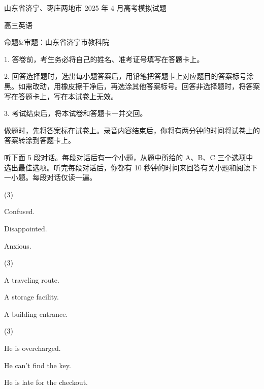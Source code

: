 \documentclass{英语试卷}
\begin{document}
\par 山东省济宁、枣庄两地市 2025 年 4 月高考模拟试题\par
\par 高三英语\par
\par 命题\&审题：山东省济宁市教科院\par
\begin{notice}
\par 1. 答卷前，考生务必将自己的姓名、准考证号填写在答题卡上。\par
\par 2. 回答选择题时，选出每小题答案后，用铅笔把答题卡上对应题目的答案标号涂黑。如需改动，用橡皮擦干净后，再选涂其他答案标号。回答非选择题时，将答案写在答题卡上，写在本试卷上无效。\par
\par 3. 考试结束后，将本试卷和答题卡一并交回。\par
\end{notice}
\par 做题时，先将答案标在试卷上。录音内容结束后，你将有两分钟的时间将试卷上的答案转涂到答题卡上。\par
{}
\par 听下面 5 段对话。每段对话后有一个小题，从题中所给的 A、B、C 三个选项中选出最佳选项。听完每段对话后，你都有 10 秒钟的时间来回答有关小题和阅读下一小题。每段对话仅读一遍。\par
{}
\begin{choices}(3)
  \item Confused.
  \item Disappointed.
  \item Anxious.
\end{choices}
\begin{choices}(3)
  \item A traveling route.
  \item A storage facility.
  \item A building entrance.
\end{choices}
\begin{choices}(3)
  \item He is overcharged.
  \item He can't find the key.
  \item He is late for the checkout.
\end{choices}
\end{document}
